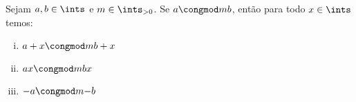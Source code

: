 \begin{exercise}
  Sejam $a,b \in \ints$ e $m \in \ints_{>0}$. Se $a \congmod m b$, ent\~ao para
  todo $x \in \ints$ temos:
  \begin{enumerate}[(i)]
  \item $a+x \congmod m {b+x}$
  \item $ax \congmod m {bx}$
  \item $-a \congmod m {-b}$
  \end{enumerate}
\end{exercise}
